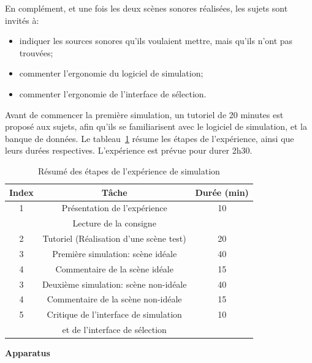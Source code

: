 En complément, et une fois les deux scènes sonores réalisées, les sujets sont invités à:

\begin{itemize}
\item indiquer les sources sonores qu'ils voulaient mettre, mais qu'ils n'ont pas trouvées;
\item commenter l’ergonomie du logiciel de simulation;
\item commenter l’ergonomie de l'interface de sélection.
\end{itemize}

Avant de commencer la première simulation, un tutoriel de 20 minutes est proposé aux sujets, afin qu'ils se familiarisent avec le logiciel de simulation, et la banque de données. Le tableau~\ref{tab:indSimu} résume les étapes de l’expérience, ainsi que leurs durées respectives. L'expérience est prévue pour durer 2h30. \\

\begin{table}[t]
\centering
\begin{tabular}{c c c} 
Index          & Tâche                               & Durée (min) \\                      
\hline
1 & Présentation de l'expérience                     & 10 \\
  & Lecture de la consigne                           &  \\
\hline
2 & Tutoriel (Réalisation d'une scène test)          & 20 \\
\hline
3 & Première simulation: scène idéale                & 40 \\
\hline
4  & Commentaire de la scène idéale                  & 15 \\
\hline
3 & Deuxième simulation: scène non-idéale            & 40  \\
\hline
4  & Commentaire de la scène non-idéale              & 15 \\
\hline
5 & Critique de l'interface de simulation            & 10 \\
  & et de l'interface de sélection                   & \\
\hline
\end{tabular}
\vspace{0.5mm}
\caption{Résumé des étapes de l’expérience de simulation}
\label{tab:indSimu}
\end{table}

\textbf{Apparatus} \\


